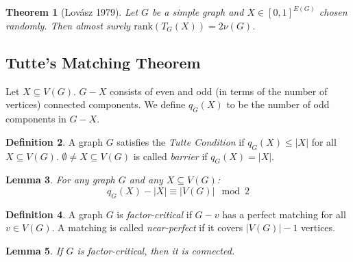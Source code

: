 \documentclass[11pt, a4paper]{article}
\newcommand{\abs}[1]{\left\lvert#1\right\rvert}
\newtheorem{theorem}{Theorem}[section]
\newtheorem{lemma}[theorem]{Lemma}
\theoremstyle{remark}
\theoremstyle{definition}
\newtheorem{definition}[theorem]{Definition}
\begin{document}
\begin{theorem}[Lovász 1979]
	Let $G$ be a simple graph and $X\in [0,1]^{E(G)}$ chosen randomly.
	Then almost surely $\mathrm{rank}(T_G(X))=2\nu(G)$.
\end{theorem}


\subsection{Tutte's Matching Theorem}
Let $X\subseteq V(G)$. $G-X$ consists of even and odd (in terms of the
number of vertices) connected components. We define $q_G(X)$ to be the
number of odd components in $G-X$.

\begin{definition}
	A graph $G$ satisfies the \emph{Tutte Condition} if $q_G(X)\leq\abs{X}$
	for all $X\subseteq V(G)$. $\emptyset\neq X\subseteq V(G)$ is called
	\emph{barrier} if $q_G(X)=\abs{X}$.
\end{definition}

\begin{lemma}\label{prop:tutte-even} %
	For any graph $G$ and any $X\subseteq V(G)$:
	\[q_G(X)-\abs{X} \equiv \abs{V(G)}\mod 2\]
\end{lemma}

\begin{definition}
	A graph $G$ is \emph{factor-critical} if $G-v$ has a perfect matching
	for all $v\in V(G)$. A matching is called \emph{near-perfect} if it
	covers $\abs{V(G)}-1$ vertices.
\end{definition}

\begin{lemma} %
	 If $G$ is factor-critical, then it is connected.
\end{lemma}
\end{document}
